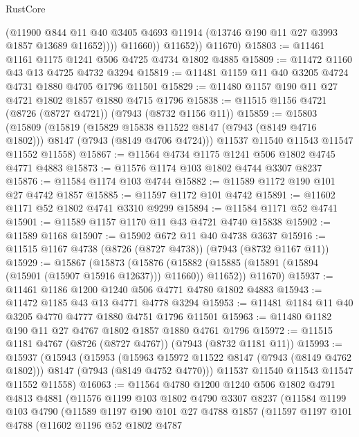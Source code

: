 \begin{lexlean}{RustCore}
\begin{coremodule}
                  (@11900
                    @844
                    @11
                    @40
                    @3405
                    @4693
                    @11914
                    (@13746 @190 @11 @27 @3993 @1857 @13689 @11652))))
              @11660))
          @11652))
      @11670)
@15803 := @11461 @1161 @1175 @1241 @506 @4725 @4734 @1802 @4885
@15809 := @11472 @1160 @43 @13 @4725 @4732 @3294
@15819 := @11481 @1159 @11 @40 @3205 @4724 @4731 @1880 @4705 @1796 @11501
@15829 := @11480 @1157 @190 @11 @27 @4721 @1802 @1857 @1880 @4715 @1796
@15838 := @11515 @1156 @4721 (@8726 (@8727 @4721)) (@7943 (@8732 @1156 @11))
@15859 := @15803
    (@15809
      (@15819
        (@15829 @15838 @11522 @8147 (@7943 (@8149 @4716 @1802)))
        @8147
        (@7943 (@8149 @4706 @4724)))
      @11537
      @11540
      @11543
      @11547
      @11552
      @11558)
@15867 := @11564 @4734 @1175 @1241 @506 @1802 @4745 @4771 @4883
@15873 := @11576 @1174 @103 @1802 @4744 @3307 @8237
@15876 := @11584 @1174 @103 @4744
@15882 := @11589 @1172 @190 @101 @27 @4742 @1857
@15885 := @11597 @1172 @101 @4742
@15891 := @11602 @1171 @52 @1802 @4741 @3310 @9299
@15894 := @11584 @1171 @52 @4741
@15901 := @11589 @1157 @1170 @11 @43 @4721 @4740 @15838
@15902 := @11589 @1168
@15907 := @15902 @672 @11 @40 @4738 @3637
@15916 := @11515 @1167 @4738 (@8726 (@8727 @4738)) (@7943 (@8732 @1167 @11))
@15929 := @15867
    (@15873
      (@15876 (@15882 (@15885 (@15891 (@15894 (@15901 (@15907 @15916 @12637))) @11660)) @11652))
      @11670)
@15937 := @11461 @1186 @1200 @1240 @506 @4771 @4780 @1802 @4883
@15943 := @11472 @1185 @43 @13 @4771 @4778 @3294
@15953 := @11481 @1184 @11 @40 @3205 @4770 @4777 @1880 @4751 @1796 @11501
@15963 := @11480 @1182 @190 @11 @27 @4767 @1802 @1857 @1880 @4761 @1796
@15972 := @11515 @1181 @4767 (@8726 (@8727 @4767)) (@7943 (@8732 @1181 @11))
@15993 := @15937
    (@15943
      (@15953
        (@15963 @15972 @11522 @8147 (@7943 (@8149 @4762 @1802)))
        @8147
        (@7943 (@8149 @4752 @4770)))
      @11537
      @11540
      @11543
      @11547
      @11552
      @11558)
@16063 := @11564
    @4780
    @1200
    @1240
    @506
    @1802
    @4791
    @4813
    @4881
    (@11576
      @1199
      @103
      @1802
      @4790
      @3307
      @8237
      (@11584
        @1199
        @103
        @4790
        (@11589
          @1197
          @190
          @101
          @27
          @4788
          @1857
          (@11597
            @1197
            @101
            @4788
            (@11602
              @1196
              @52
              @1802
              @4787

\end{coremodule}
\end{lexlean}
